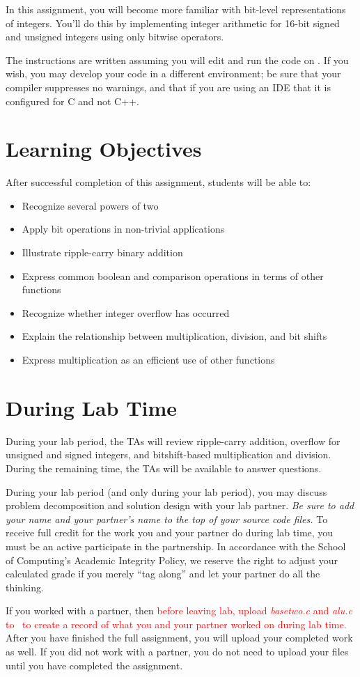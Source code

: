 In this assignment, you will become more familiar with bit-level representations of integers.
You'll do this by implementing integer arithmetic for 16-bit signed and unsigned integers using only bitwise operators.

The instructions are written assuming you will edit and run the code on \runtimeenvironment.
If you wish, you may develop your code in a different environment;
be sure that your compiler suppresses no warnings, and that if you are using an IDE that it is configured for C and not C++.

\tableofcontents

\section*{Learning Objectives}

After successful completion of this assignment, students will be able to:
\begin{itemize}
    \item Recognize several powers of two
    \item Apply bit operations in non-trivial applications
    \item Illustrate ripple-carry binary addition
    \item Express common boolean and comparison operations in terms of other functions
    \item Recognize whether integer overflow has occurred
    \item Explain the relationship between multiplication, division, and bit shifts
    \item Express multiplication as an efficient use of other functions
\end{itemize}

\section*{During Lab Time}

During your lab period, the TAs will review ripple-carry addition, overflow for unsigned and signed integers, and bitshift-based multiplication and division.
During the remaining time, the TAs will be available to answer questions.

During your lab period (and only during your lab period), you may discuss problem decomposition and solution design with your lab partner.
\textit{Be sure to add your name and your partner's name to the top of your source code files.}
To receive full credit for the work you and your partner do during lab time, you must be an active participate in the partnership.
In accordance with the School of Computing's Academic Integrity Policy, we reserve the right to adjust your calculated grade if you merely ``tag along'' and let your partner do all the thinking.

If you worked with a partner, then \textcolor{red}{before leaving lab, upload \textit{basetwo.c} and \textit{alu.c} to \filesubmission\ to create a record of what you and your partner worked on during lab time.}
After you have finished the full assignment, you will upload your completed work as well.
If you did not work with a partner, you do not need to upload your files until you have completed the assignment.